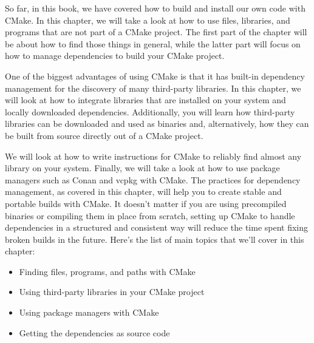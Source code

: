 So far, in this book, we have covered how to build and install our own code with CMake. In this chapter, we will take a look at how to use files, libraries, and programs that are not part of a CMake project. The first part of the chapter will be about how to find those things in general, while the latter part will focus on how to manage dependencies to build your CMake project.

One of the biggest advantages of using CMake is that it has built-in dependency management for the discovery of many third-party libraries. In this chapter, we will look at how to integrate libraries that are installed on your system and locally downloaded dependencies. Additionally, you will learn how third-party libraries can be downloaded and used as binaries and, alternatively, how they can be built from source directly out of a CMake project.

We will look at how to write instructions for CMake to reliably find almost any library on your system. Finally, we will take a look at how to use package managers such as Conan and vcpkg with CMake. The practices for dependency management, as covered in this chapter, will help you to create stable and portable builds with CMake. It doesn't matter if you are using precompiled binaries or compiling them in place from scratch, setting up CMake to handle dependencies in a structured and consistent way will reduce the time spent fixing broken builds in the future. Here's the list of main topics that we'll cover in this chapter:

\begin{itemize}
\item 
Finding files, programs, and paths with CMake

\item 
Using third-party libraries in your CMake project

\item 
Using package managers with CMake

\item 
Getting the dependencies as source code
\end{itemize}













